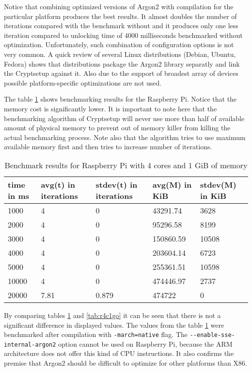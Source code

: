 \documentclass[nolof]{fithesis3}
\begin{document}
Notice that combining optimized versions of Argon2 with compilation for the particular platform produces the best results. It almost doubles the number of iterations compared with the benchmark without and it produces only one less iteration compared to unlocking time of 4000 milliseconds benchmarked without optimization. Unfortunately, such combination of configuration options is not very common. A quick review of several Linux distributions (Debian, Ubuntu, Fedora) shows that distributions package the Argon2 library separatly and link the Cryptsetup against it. Also due to the support of broadest array of devices possible platform-specific optimizations are not used.

The table \ref{tab:r4c1g} shows benchmarking results for the Raspberry Pi.  Notice that the memory cost is significantly lower. It is important to note here that the benchmarking algorithm of Cryptsetup will never use more than half of available amount of physical memory to prevent out of memory killer from killing the actual benchmarking process. Note also that the algorithm tries to use maximum available memory first and then tries to increase number of iterations.

\noindent
\begin{table}
\caption{Benchmark results for Raspberry Pi with 4 cores and 1 GiB of memory}
\label{tab:r4c1g}
\begin{tabularx}{\textwidth}{| X | X | X | X | X |}
\hline
time in ms & avg(t)  in iterations & stdev(t) in iterations & avg(M) in KiB & stdev(M) in KiB\\
\hline
1000 & 4 & 0 & 43291.74 & 3628\\
\hline
2000 & 4 & 0 & 95296.58 & 8199\\
\hline
3000 & 4 & 0 & 150860.59 & 10508\\
\hline
4000 & 4 & 0 & 203604.14 & 6723\\
\hline
5000 & 4 & 0 & 255361.51 & 10598\\
\hline
10000 & 4 & 0 & 474446.97 & 2737\\
\hline
20000 & 7.81 & 0.879 & 474722 & 0\\
\hline
\end{tabularx}
\end{table}

By comparing tables \ref{tab:r4c1g} and \ref{tab:r4c1go} it can be seen that there is not a significant difference in displayed values. The values from the table \ref{tab:r4c1g} were benchmarked after compilation with \verb+-march=native+ flag. The \verb+--enable-sse-internal-argon2+ option cannot be used on Raspberry Pi, because the ARM architecture does not offer this kind of CPU instructions. It also confirms the premise that Argon2 should be difficult to optimize for other platforms than X86.
\end{document}
